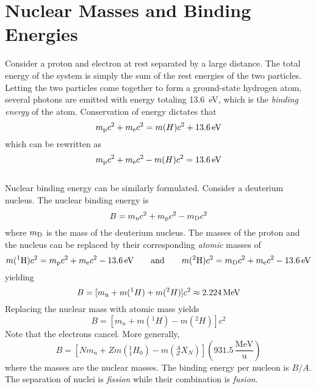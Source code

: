 \documentclass{subfiles}
\begin{document}
	\section{Nuclear Masses and Binding Energies}
		Consider a proton and electron at rest separated by a large distance. The total energy of the system is simply the sum of the rest energies of the two particles. Letting the two particles come together to form a ground-state hydrogen atom, several photons are emitted with energy totaling \SI{13.6}{eV}, which is the \textit{binding energy} of the atom. Conservation of energy dictates that
			\[m_{\text{p}}c^2 + m_{\text{e}}c^2 = m(H)c^2 + \SI{13.6}{eV}\]
			which can be rewritten as
			\[m_{\text{p}}c^2 + m_{\text{e}}c^2 - m(H)c^2 = \SI{13.6}{eV}\] \\
			Nuclear binding energy can be similarly formulated. Consider a deuterium nucleus. The nuclear binding energy is
			\[B = m_{\text{n}}c^2 + m_{\text{p}}c^2 -m_{\text{D}}c^2\]
			where \(m_{\text{D}}\) is the mass of the deuterium nucleus. The masses of the proton and the nucleus can be replaced by their corresponding \textit{atomic} masses of
			\[
				m(^1\mathrm{H})c^2 = m_{\text{p}}c^2 + m_{\text{e}}c^2 - \SI{13.6}{eV} \qquad \text{and} \qquad
				m(^{2}\mathrm{H})c^2 = m_{\text{D}}c^2 + m_{\text{e}}c^2 - \SI{13.6}{eV}
			\]
			yielding
			\[
				B = [m_{\text{n}} + m(^1H) + m(^2H)]c^2
					\approx \SI{2.224}{MeV}
			\]
			Replacing the nuclear mass with atomic mass yields
			\[B = [m_n + m(^1H) - m(^2H)]c^2\]
			Note that the electrons cancel. More generally,
			\[
				B = [Nm_n + Zm(^1_1H_0) - m(^A_ZX_N)]\left(931.5\,\mathrm{\frac{MeV}{u}}\right)
			\]
			where the masses are the nuclear masses. The binding energy per nucleon is \(B/A\). \\
			The separation of nuclei is \textit{fission} while their combination is \textit{fusion}.
			
\end{document}
